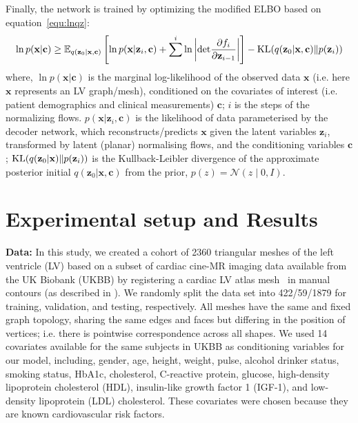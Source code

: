 \documentclass[runningheads]{llncs}
\begin{document}
Finally, the network is trained by optimizing the modified ELBO based on equation~\ref{equ:lnqz}:
\begin{equation}
    \ln p(\textbf{x} \vert \textbf{c}) \geq \mathbb{E}_{q(\textbf{z}_{0} \vert \textbf{x}, \textbf{c})} \left\lbrack \ln p(\textbf{x} \vert \textbf{z}_{i}, \textbf{c}) + \sum^{i} \ln \left\vert {\rm det} \frac{\partial f_{i}}{\partial \textbf{z}_{i-1}} \right\vert \right\rbrack - {\rm KL}(q(\textbf{z}_{0} \vert \textbf{x}, \textbf{c}) \| p(\textbf{z}_i))
\end{equation}
where, $\ln p(\textbf{x} \vert \textbf{c})$ is the marginal log-likelihood of the observed data $\textbf{x}$ (i.e. here $\mathbf{x}$ represents an LV graph/mesh), conditioned on the covariates of interest (i.e. patient demographics and clinical measurements) $\textbf{c}$; $i$ is the steps of the normalizing flows. $p(\textbf{x}\vert\textbf{z}_{i}, \textbf{c})$ is the likelihood of data parameterised by the decoder network, which reconstructs/predicts $\textbf{x}$ given the latent variables $\textbf{z}_{i}$, transformed by latent (planar) normalising flows, and the conditioning variables $\textbf{c}$; ${\rm KL}(q(\textbf{z}_{0} \vert \textbf{x}) \| p(\textbf{z}_i))$ is the Kullback-Leibler divergence of the approximate posterior initial $q(\textbf{z}_{0} \vert \textbf{x}, \textbf{c})$ from the prior, $p(z)=\mathcal{N}(z \mid 0, I)$.

\section{Experimental setup and  Results}

\textbf{Data:} In this study, we created a cohort of 2360 triangular meshes of the left ventricle (LV) based on a subset of cardiac cine-MR imaging data available from the UK Biobank (UKBB) by registering a cardiac LV atlas mesh~\cite{rodero2021linking} in manual contours (as described in \cite{xia2022automatic}). We randomly split the data set into 422/59/1879 for training, validation, and testing, respectively. All meshes have the same and fixed graph topology, sharing the same edges and faces but differing in the position of vertices; i.e. there is pointwise correspondence across all shapes. We used 14 covariates available for the same subjects in UKBB as conditioning variables for our model, including, gender, age, height, weight, pulse, alcohol drinker status, smoking status, HbA1c, cholesterol, C-reactive protein, glucose, high-density lipoprotein cholesterol (HDL), insulin-like growth factor 1 (IGF-1), and low-density lipoprotein (LDL) cholesterol. These covariates were chosen because they are known cardiovascular risk factors.
\end{document}
